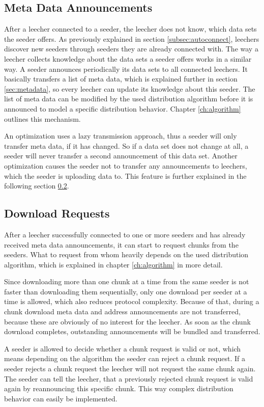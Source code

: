 \subsection{Meta Data Announcements}
After a leecher connected to a seeder, the leecher does not know, which data sets the seeder offers. As previously explained in section \ref{subsec:autoconnect}, leechers discover new seeders through seeders they are already connected with. The way a leecher collects knowledge about the data sets a seeder offers works in a similar way. A seeder announces periodically its data sets to all connected leechers. It basically transfers a list of meta data, which is explained further in section \ref{sec:metadata}, so every leecher can update its knowledge about this seeder. The list of meta data can be modified by the used distribution algorithm before it is announced to model a specific distribution behavior. Chapter \ref{ch:algorithm} outlines this mechanism.

An optimization uses a lazy transmission approach, thus a seeder will only transfer meta data, if it has changed. So if a data set does not change at all, a seeder will never transfer a second announcement of this data set. Another optimization causes the seeder not to transfer any announcements to leechers, which the seeder is uploading data to. This feature is further explained in the following section \ref{subsec:downloadreq}.


\subsection{Download Requests}
\label{subsec:downloadreq}
After a leecher successfully connected to one or more seeders and has already received meta data announcements, it can start to request chunks from the seeders. What to request from whom heavily depends on the used distribution algorithm, which is explained in chapter \ref{ch:algorithm} in more detail. 

Since downloading more than one chunk at a time from the same seeder is not faster than downloading them sequentially, only one download per seeder at a time is allowed, which also reduces protocol complexity. Because of that, during a chunk download meta data and address announcements are not transferred, because these are obviously of no interest for the leecher. As soon as the chunk download completes, outstanding announcements will be bundled and transferred.

A seeder is allowed to decide whether a chunk request is valid or not, which means depending on the algorithm the seeder can reject a chunk request. If a seeder rejects a chunk request the leecher will not request the same chunk again. The seeder can tell the leecher, that a previously rejected chunk request is valid again by reannouncing this specific chunk. This way complex distribution behavior
can easily be implemented.


